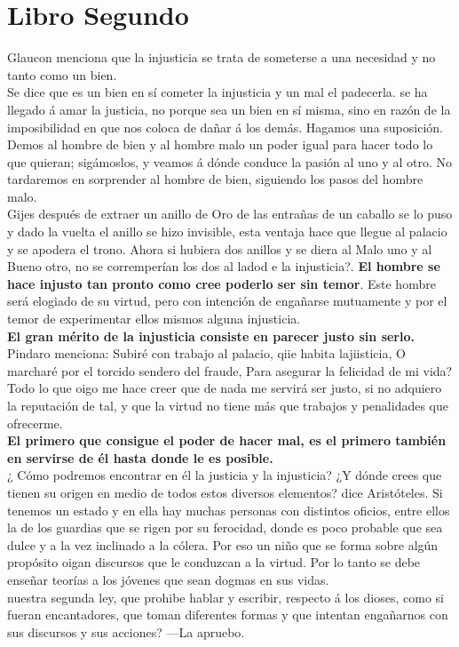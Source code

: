 \documentclass[10pt]{book}
\begin{document}
\chapter*{Libro Segundo}
Glaucon menciona que la injusticia se trata de someterse a una necesidad y no tanto como un bien. \\
Se dice que es un bien en sí cometer la injusticia y un mal el padecerla.
se ha llegado á amar la justicia, no porque sea un bien en sí misma, sino en razón de la imposibilidad en que nos coloca de dañar á los demás. Hagamos una suposición. Demos al hombre de bien y al hombre malo un poder igual para hacer todo lo que quieran; sigámoslos, y veamos á dónde conduce la pasión al uno y al otro. No tardaremos en sorprender al hombre de bien, siguiendo los pasos del hombre malo. \\
Gijes después de extraer un anillo de Oro de las entrañas de un caballo se lo puso y dado la vuelta el anillo se hizo invisible, esta ventaja hace que llegue al palacio y se apodera el trono. Ahora si hubiera dos anillos y se diera al Malo uno y al Bueno otro, no se corremperían los dos al ladod e la injusticia?. \textbf{El hombre se hace injusto tan pronto como cree poderlo ser sin temor}. Este hombre será elogiado de su virtud, pero con intención de engañarse mutuamente y por el temor de experimentar ellos mismos alguna injusticia.\\
\textbf{El gran mérito de la injusticia consiste en parecer justo sin serlo.} \\
Pindaro menciona: Subiré con trabajo al palacio, qiie habita lajiisticia, O marcharé por el torcido sendero del fraude, Para asegurar la felicidad de mi vida?\\
Todo lo que oigo me hace creer que de nada me servirá ser justo, si no adquiero la reputación de tal, y que  la virtud no tiene más que trabajos y penalidades que ofrecerme. \\
\textbf{El primero que consigue el poder de hacer mal, es el primero también en servirse de él hasta donde le es posible.} \\
¿ Cómo podremos encontrar en él la justicia y la injusticia? ¿Y dónde crees que tienen su origen en medio de todos estos diversos elementos? dice Aristóteles. Si tenemos un estado y en ella hay muchas personas con distintos oficios, entre ellos la de los guardias que se rigen por su ferocidad, donde es poco probable que sea dulce y a la vez inclinado a la cólera. Por eso un niño que se forma sobre algún propósito oigan discursos que le conduzcan a la virtud. Por lo tanto se debe enseñar teorías a los jóvenes que sean dogmas en sus vidas.\\
nuestra segunda ley, que prohibe hablar y escribir, respecto á los dioses, como si fueran encantadores, que toman diferentes formas y que intentan engañarnos con sus discursos y sus acciones? —La apruebo.
\end{document}
